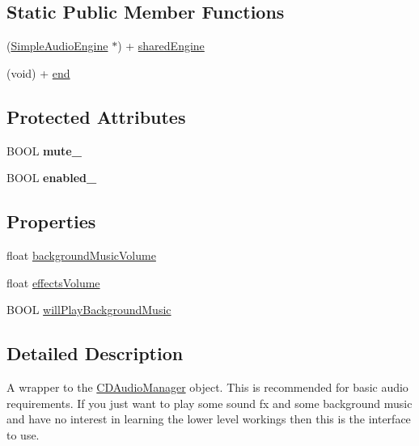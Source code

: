 \subsection*{Static Public Member Functions}
\begin{DoxyCompactItemize}
\item 
(\hyperlink{interface_simple_audio_engine}{Simple\-Audio\-Engine} $\ast$) + \hyperlink{interface_simple_audio_engine_aa571a8e565bfe5153919b3151d9f26f4}{shared\-Engine}
\item 
(void) + \hyperlink{interface_simple_audio_engine_a2750af49fe41ee3fcf3d544f05ef3c73}{end}
\end{DoxyCompactItemize}
\subsection*{Protected Attributes}
\begin{DoxyCompactItemize}
\item 
\hypertarget{interface_simple_audio_engine_a9370736b2fbf3ca0927010f837c04a87}{B\-O\-O\-L {\bfseries mute\-\_\-}}\label{interface_simple_audio_engine_a9370736b2fbf3ca0927010f837c04a87}

\item 
\hypertarget{interface_simple_audio_engine_a5d889af8713eaf7bdd4900bd6319c580}{B\-O\-O\-L {\bfseries enabled\-\_\-}}\label{interface_simple_audio_engine_a5d889af8713eaf7bdd4900bd6319c580}

\end{DoxyCompactItemize}
\subsection*{Properties}
\begin{DoxyCompactItemize}
\item 
float \hyperlink{interface_simple_audio_engine_a7e28cfae58e49d3b6dd4a1ca9b8b54b5}{background\-Music\-Volume}
\item 
float \hyperlink{interface_simple_audio_engine_a0c529082c00086142cdc19b92098453a}{effects\-Volume}
\item 
B\-O\-O\-L \hyperlink{interface_simple_audio_engine_a2838b12d2c986358cb16d7527ad644ac}{will\-Play\-Background\-Music}
\end{DoxyCompactItemize}


\subsection{Detailed Description}
A wrapper to the \hyperlink{interface_c_d_audio_manager}{C\-D\-Audio\-Manager} object. This is recommended for basic audio requirements. If you just want to play some sound fx and some background music and have no interest in learning the lower level workings then this is the interface to use.

